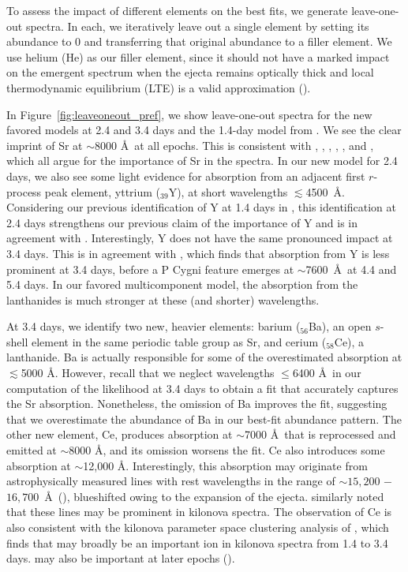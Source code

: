 \documentclass[twocolumn,twocolappendix]{aastex63}
\def\V23{\citetalias{vieira23}}
\begin{document}
{{{{{{To assess the impact of different elements on the best fits, we generate leave-one-out spectra. In each, we iteratively leave out a single element by setting its abundance to 0 and transferring that original abundance to a filler element. We use helium (He) as our filler element, since it should not have a marked impact on the emergent spectrum when the ejecta remains optically thick and local thermodynamic equilibrium (LTE) is a valid approximation (\citealt{perego22, tarumi23}).

In Figure~\ref{fig:leaveoneout_pref}, we show leave-one-out spectra for the new favored models at 2.4 and 3.4 days and the 1.4-day model from \V23. We see the clear imprint of Sr at $\sim$8000 \AA~at all epochs. This is consistent with \cite{watson19}, \cite{domoto21}, \cite{domoto22}, \cite{gillanders22}, \cite{sneppenwatson23}, and \cite{sneppen23}, which all argue for the importance of Sr in the spectra. In our new model for 2.4 days, we also see some light evidence for absorption from an adjacent first $r$-process peak element, yttrium (${}_{39}$Y), at short wavelengths $\lesssim$4500~\AA. Considering our previous identification of Y at 1.4 days in \V23, this identification at 2.4 days strengthens our previous claim of the importance of Y and is in agreement with \cite{gillanders22}. Interestingly, Y does not have the same pronounced impact at 3.4 days. This is in agreement with \cite{sneppenwatson23}, which finds that absorption from Y is less prominent at 3.4 days, before a P Cygni feature emerges at $\sim$7600~\AA~at 4.4 and 5.4 days. In our favored multicomponent model, the absorption from the lanthanides is much stronger at these (and shorter) wavelengths. 

At 3.4 days, we identify two new, heavier elements: barium (${}_{56}$Ba), an open $s$-shell element in the same periodic table group as Sr, and cerium (${}_{58}$Ce), a lanthanide. Ba is actually responsible for some of the overestimated absorption at $\lesssim$5000 \AA. However, recall that we neglect wavelengths $\leqslant$6400 \AA~in our computation of the likelihood at 3.4 days to obtain a fit that accurately captures the Sr absorption. Nonetheless, the omission of Ba improves the fit, suggesting that we overestimate the abundance of Ba in our best-fit abundance pattern. The other new element, Ce, produces absorption at $\sim$7000 \AA~that is reprocessed and emitted at $\sim$8000 \AA, and its omission worsens the fit. Ce also introduces some absorption at $\sim$12,000 \AA. Interestingly, this absorption may originate from astrophysically measured  lines with rest wavelengths in the range of $\sim$$15,200$ $-$ $16,700$~\AA~(\citealt{cunha17, majewski17}), blueshifted owing to the expansion of the ejecta. \cite{domoto21} similarly noted that these  lines may be prominent in kilonova spectra. The observation of Ce is also consistent with the kilonova parameter space clustering analysis of \cite{ford23}, which finds that  may broadly be an important ion in kilonova spectra from 1.4 to 3.4 days.  may also be important at later epochs (\citealt{gillanders23}). 

}}}}}}
\end{document}

